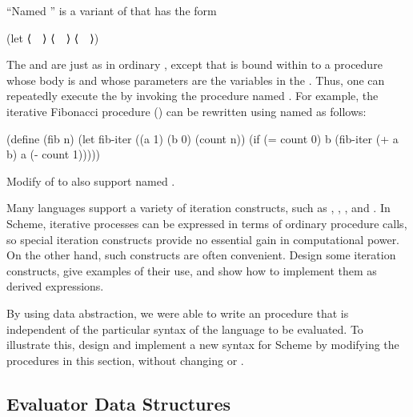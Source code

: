\begin{exercise}
	\label{Exercise 4.8}
	“Named ” is a variant of  that has the form
	\begin{scheme}
		(let ⟨~~⟩ ⟨~~⟩ ⟨~~⟩)
	\end{scheme}
	The  and  are just as in ordinary , except that  is bound within  to a procedure whose body is  and whose parameters are the variables in the \code{⟨\var{bindings}⟩}.
	Thus, one can repeatedly execute the  by invoking the procedure named \code{⟨\var{var}⟩}.
	For example, the iterative Fibonacci procedure () can be rewritten using named  as follows:
	\begin{scheme}
	  (define (fib n)
	    (let fib-iter ((a 1)
	                   (b 0)
	                   (count n))
	      (if (= count 0)
	          b
	          (fib-iter (+ a b) a (- count 1)))))
	\end{scheme}
	Modify  of  to also support named .
\end{exercise}



\begin{exercise}
	\label{Exercise 4.9}
	Many languages support a variety of iteration constructs, such as , , , and .
	In Scheme, iterative processes can be expressed in terms of ordinary procedure calls, so special iteration constructs provide no essential gain in computational power.
	On the other hand, such constructs are often convenient.
	Design some iteration constructs, give examples of their use, and show how to implement them as derived expressions.
\end{exercise}



\begin{exercise}
	\label{Exercise 4.10}
	By using data abstraction, we were able to write an  procedure that is independent of the particular syntax of the language to be evaluated.
	To illustrate this, design and implement a new syntax for Scheme by modifying the procedures in this section, without changing  or .
\end{exercise}



\subsection{Evaluator Data Structures}
\label{Section 4.1.3}

